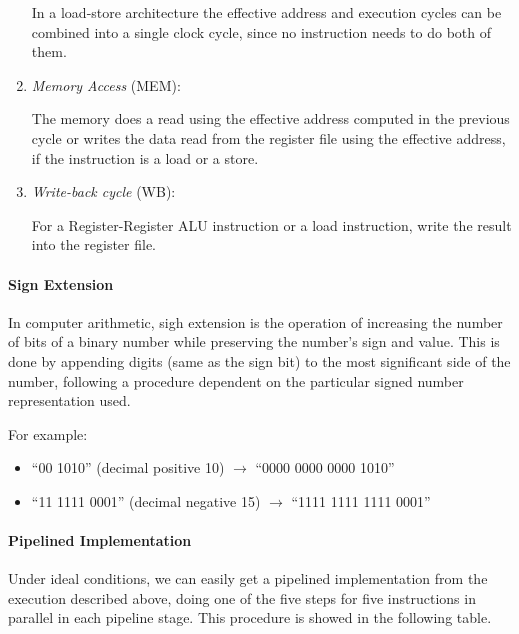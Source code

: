 \documentclass[12pt, a4paper]{article}
\theoremstyle{margin}
\begin{document}
\begin{enumerate}
          In a load-store architecture the effective address and execution cycles can be combined into a single clock cycle, since no instruction needs to do both of them.

          \item \emph{Memory Access} (MEM):

          The memory does a read using the effective address computed in the previous cycle or writes the data read from the register file using the effective address, if the instruction is a load or a store.

          \item \emph{Write-back cycle} (WB):

          For a Register-Register ALU instruction or a load instruction, write the result into the register file.
        \end{enumerate}

      \paragraph{Sign Extension} In computer arithmetic, sigh extension is the operation of increasing the number of bits of a binary number while preserving the number's sign and value. This is done by appending digits (same as the sign bit) to the most significant side of the number, following a procedure dependent on the particular signed number representation used.
      
      For example:
        \begin{itemize}
          \item ``00 1010'' (decimal positive 10) $\rightarrow$ ``0000 0000 0000 1010''
          \item ``11 1111 0001'' (decimal negative 15) $\rightarrow$ ``1111 1111 1111 0001''
        \end{itemize}

      \paragraph{Pipelined Implementation\cite{caqa}}
      Under ideal conditions, we can easily get a pipelined implementation from the execution described above, doing one of the five steps for five instructions in parallel in each pipeline stage. This procedure is showed in the following table.
      
\end{document}
